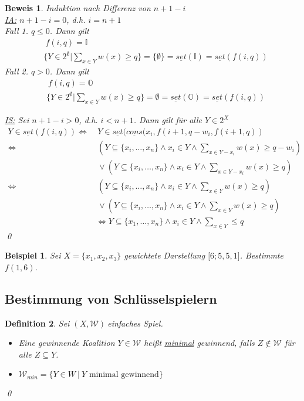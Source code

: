 \documentclass[ngerman]{scrartcl}
\theoremstyle{custom}
\newtheorem{mdef}{Definition} \numberwithin{mdef}{subsection}
\newtheorem{mex}[mdef]{Beispiel}
\newtheorem*{bw}{Beweis}
\newcommand{\0}{\mathbf{0}}
\newcommand{\1}{\mathbf{L}}
\newcommand{\set}{\underline{set}}
\newcommand{\cons}{\underline{cons}}
\newcommand{\sg}{$(X,\mathcal{W})~$}
\begin{document}
\begin{bw}
Induktion nach Differenz von $n+1-i$\\
\underline{IA:} $n+1-i = 0$, d.h. $i = n+1$\\
Fall 1. $q \leq 0$. Dann gilt 
\begin{align*}
&~f(i,q) = \mathds{I}\\
&\biggr \{Y \in 2^{\emptyset} \biggr \vert \sum_{x \in Y} w(x) \geq q
\biggr \} = \{\emptyset\} = \set(\mathds{I}) = \set(f(i,q))
\end{align*}
Fall 2. $q > 0$. Dann gilt
\begin{align*}
&~f(i,q) = \mathds{O}\\
&\biggr \{Y \in 2^{\emptyset} \biggr \vert \sum_{x \in Y} w(x) \geq q
\biggr \} = \emptyset = \set(\mathds{O}) = \set(f(i,q))
\end{align*}

\underline{IS:} Sei $n+1-i>0$, d.h. $i < n+1$. Dann gilt f\"ur alle $Y
\in 2^X$
\begin{align*}
  Y \in \set(f(i,q)) \Leftrightarrow &~ Y \in
  \set(\cons(x_i,f(i+1,q-w_i,
  f(i+1, q))\\
  \Leftrightarrow &~ (Y \subseteq \{x_i, \dots, x_n\} \wedge x_i \in Y
  \wedge \sum_{x \in Y-x_i} w(x) \geq q - w_i) \\ &~\vee (Y \subseteq
  \{x_i, \dots, x_n\} \wedge x_i \in Y
  \wedge \sum_{x \in Y-x_i} w(x) \geq q)\\
  \Leftrightarrow &~ (Y \subseteq \{x_i, \dots, x_n\} \wedge x_i \in Y
  \wedge \sum_{x \in Y} w(x) \geq q)\\
  & ~\vee (Y \subseteq \{x_i, \dots, x_n\} \wedge x_i \in Y \wedge
  \sum_{x \in Y} w(x) \geq q)\\
  & \Leftrightarrow Y \subseteq \{x_1, \dots, x_n\} \wedge x_i \in Y
  \wedge \sum_{x \in Y} \leq q
\end{align*}
\qed
\end{bw}

\begin{mex}
Sei $X = \{x_1,x_2,x_3\}$ gewichtete Darstellung $\lbrack 6;
5,5,1\rbrack$. Bestimmte $f(1,6)$.
\end{mex}

\subsection{Bestimmung von Schl\"usselspielern}
\begin{mdef}
Sei \sg einfaches Spiel.
\begin{itemize}
\item[(1)] Eine gewinnende Koalition $Y \in \mathcal{W}$ hei\ss t
  \underline{minimal} gewinnend, falls $Z \not \in \mathcal{W}$ f\"ur
  alle $Z \subseteq Y$.
\item[(2)] $\mathcal{W}_{min} = \{ Y \in W ~\vert~ Y \text{ minimal
    gewinnend} \}$
\end{itemize}
\qed
\end{mdef}
\end{document}
